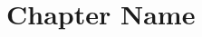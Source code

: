 \documentclass[a4paper,11pt]{report}
\begin{document}
\tableofcontents

\chapter{Chapter Name}

\end{document}
